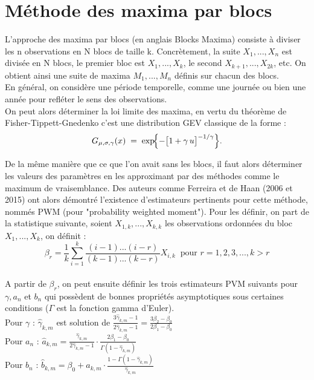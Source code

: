\documentclass{article}
\theoremstyle{plain}
\theoremstyle{definition}
\theoremstyle{plain}
\begin{document}
\section{Méthode des maxima par blocs}

\noindent L'approche des maxima par blocs (en anglais Blocks Maxima) consiste à diviser les n observations en N blocs de taille k. Concrètement, la suite $X_1, ..., X_n$ est divisée en N blocs, le premier bloc est $X_1, ..., X_k$, le second $X_{k+1}, ..., X_{2k}$, etc. On obtient ainsi une suite de maxima $M_1, ..., M_n$ définis sur chacun des blocs.\\
\noindent En général, on considère une période temporelle, comme une journée ou bien une année pour refléter le sens des observations.  \\
\noindent On peut alors déterminer la loi limite des maxima, en vertu du théorème de Fisher-Tippett-Gnedenko c'est une distribution GEV classique de la forme :
\[
G_{\mu,\sigma,\gamma}(x)
\;=\;
\exp\!\Bigl\{-\bigl[1 + \gamma\,u\bigr]^{-1/\gamma}\Bigr\}.
\]

\noindent De la même manière que ce que l'on avait sans les blocs, il faut alors déterminer les valeurs des paramètres en les approximant par des méthodes comme le maximum de vraisemblance. Des auteurs comme Ferreira et de Haan (2006 et 2015) ont alors démontré l'existence d'estimateurs pertinents pour cette méthode, nommés PWM (pour "probability weighted moment"). Pour les définir, on part de la statistique suivante, soient $X_{1,k}, ..., X_{k,k}$ les observations ordonnées du bloc $X_1, ..., X_k$, on définit :
\[
\beta_r = \frac{1}{k} \sum_{i=1}^{k} \frac{(i-1)...(i-r)}{(k-1)...(k-r)} X_{i,k} ~ \text{ pour $r = 1,2,3,...,k>r $}
\] \\
\noindent A partir de $\beta_r$, on peut ensuite définir les trois estimateurs PVM suivants pour $\gamma, a_n$ et $b_n$ qui possèdent de bonnes propriétés asymptotiques sous certaines conditions ($\Gamma$ est la fonction gamma d'Euler). \\

\noindent Pour $\gamma$ : $\hat{\gamma}_{k,m}$ est solution de $\frac{3\hat{\gamma}_{k,m} - 1}{2\hat{\gamma}_{k,m} - 1} = \frac{3\beta_2 - \beta_0}{2\beta_1 - \beta_0} $ \\
\noindent Pour $a_n$ : $\hat{a}_{k,m} = \frac{\hat{\gamma}_{k,m}}{2\hat{\gamma}_{k,m} - 1} \cdot \frac{2\beta_1 - \beta_0}{\Gamma(1 - \hat{\gamma}_{k,m})}$ \\
\noindent Pour $b_n$ : $\hat{b}_{k,m} = \beta_0 + \hat{a}_{k,m} \cdot \frac{1 - \Gamma(1 - \hat{\gamma}_{k,m})}{\hat{\gamma}_{k,m}}$ \\
\end{document}
